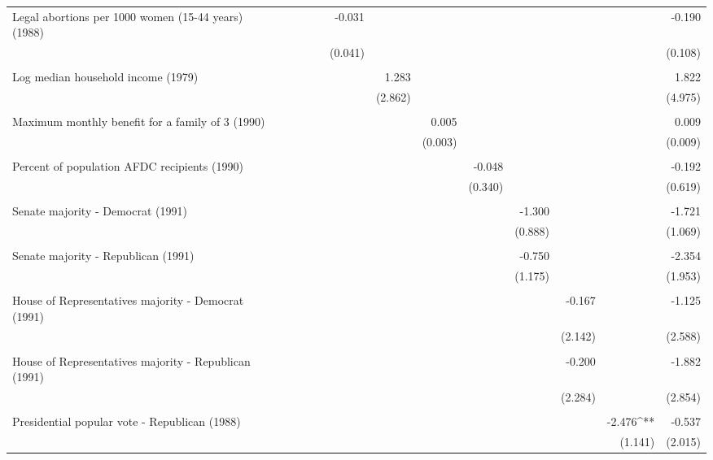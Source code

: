 \begin{table}[!htbp]
\begin{tabular}{@{\extracolsep{5pt}}lD{.}{.}{-3} D{.}{.}{-3} D{.}{.}{-3} D{.}{.}{-3} D{.}{.}{-3} D{.}{.}{-3} D{.}{.}{-3} D{.}{.}{-3} D{.}{.}{-3} D{.}{.}{-3} D{.}{.}{-3} D{.}{.}{-3} }
 Legal abortions per 1000 women (15-44 years) (1988) &  &  &  &  & -0.031 &  &  &  &  &  &  & -0.190 \\ 
  &  &  &  &  & (0.041) &  &  &  &  &  &  & (0.108) \\ 
  & & & & & & & & & & & & \\ 
 Log median household income (1979) &  &  &  &  &  & 1.283 &  &  &  &  &  & 1.822 \\ 
  &  &  &  &  &  & (2.862) &  &  &  &  &  & (4.975) \\ 
  & & & & & & & & & & & & \\ 
 Maximum monthly benefit for a family of 3 (1990) &  &  &  &  &  &  & 0.005 &  &  &  &  & 0.009 \\ 
  &  &  &  &  &  &  & (0.003) &  &  &  &  & (0.009) \\ 
  & & & & & & & & & & & & \\ 
 Percent of population AFDC recipients (1990) &  &  &  &  &  &  &  & -0.048 &  &  &  & -0.192 \\ 
  &  &  &  &  &  &  &  & (0.340) &  &  &  & (0.619) \\ 
  & & & & & & & & & & & & \\ 
 Senate majority - Democrat (1991) &  &  &  &  &  &  &  &  & -1.300 &  &  & -1.721 \\ 
  &  &  &  &  &  &  &  &  & (0.888) &  &  & (1.069) \\ 
  & & & & & & & & & & & & \\ 
 Senate majority - Republican (1991) &  &  &  &  &  &  &  &  & -0.750 &  &  & -2.354 \\ 
  &  &  &  &  &  &  &  &  & (1.175) &  &  & (1.953) \\ 
  & & & & & & & & & & & & \\ 
 House of Representatives majority - Democrat (1991) &  &  &  &  &  &  &  &  &  & -0.167 &  & -1.125 \\ 
  &  &  &  &  &  &  &  &  &  & (2.142) &  & (2.588) \\ 
  & & & & & & & & & & & & \\ 
 House of Representatives majority - Republican (1991) &  &  &  &  &  &  &  &  &  & -0.200 &  & -1.882 \\ 
  &  &  &  &  &  &  &  &  &  & (2.284) &  & (2.854) \\ 
  & & & & & & & & & & & & \\ 
 Presidential popular vote - Republican (1988) &  &  &  &  &  &  &  &  &  &  & -2.476^{**} & -0.537 \\ 
  &  &  &  &  &  &  &  &  &  &  & (1.141) & (2.015) \\ 

\end{tabular}
\end{table}
